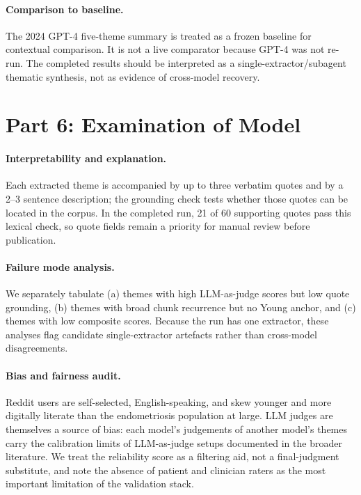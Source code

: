 \documentclass[11pt]{article}
\begin{document}
\paragraph{Comparison to baseline.}
The 2024 GPT-4 five-theme summary is treated as a frozen baseline
for contextual comparison. It is not a live comparator because GPT-4
was not re-run. The completed results should be interpreted as a
single-extractor/subagent thematic synthesis, not as evidence of
cross-model recovery.

\section*{Part 6: Examination of Model}

\paragraph{Interpretability and explanation.}
Each extracted theme is accompanied by up to three verbatim quotes
and by a 2--3 sentence description; the grounding check tests whether
those quotes can be located in the corpus. In the completed run, 21 of
60 supporting quotes pass this lexical check, so quote fields remain a
priority for manual review before publication.

\paragraph{Failure mode analysis.}
We separately tabulate (a) themes with high LLM-as-judge scores but low
quote grounding, (b) themes with broad chunk recurrence but no Young
anchor, and (c) themes with low composite scores. Because the run has
one extractor, these analyses flag candidate single-extractor artefacts
rather than cross-model disagreements.

\paragraph{Bias and fairness audit.}
Reddit users are self-selected, English-speaking, and skew younger and
more digitally literate than the endometriosis population at large.
LLM judges are themselves a source of bias: each model's judgements of
another model's themes carry the calibration limits of LLM-as-judge
setups documented in the broader literature. We treat the reliability
score as a filtering aid, not a final-judgment substitute, and note the
absence of patient and clinician raters as the most important
limitation of the validation stack.
\end{document}
